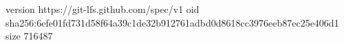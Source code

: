 version https://git-lfs.github.com/spec/v1
oid sha256:6efe01fd731d58f64a39c1de32b912761adbd0d8618cc3976eeb87ec25e406d1
size 716487
